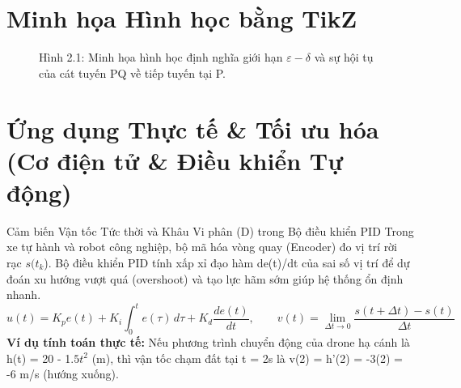 \documentclass[11pt,a4paper,oneside]{book}
\begin{document}
\section{Minh họa Hình học bằng TikZ}
\begin{figure}[htbp]
\centering
{}
\caption{Hình 2.1: Minh họa hình học định nghĩa giới hạn $\varepsilon - \delta$  và sự hội tụ của cát tuyến PQ về tiếp tuyến tại P.}
\label{fig:tikz-ch2-epsilon-delta}
\end{figure}

\section{Ứng dụng Thực tế \& Tối ưu hóa (Cơ điện tử \& Điều khiển Tự động)}
\begin{ungdung}{Cảm biến Vận tốc Tức thời và Khâu Vi phân (D) trong Bộ điều khiển PID}
Trong xe tự hành và robot công nghiệp, bộ mã hóa vòng quay (Encoder) đo vị trí rời rạc $s(t_k$). Bộ điều khiển PID tính xấp xỉ đạo hàm de(t)/dt của sai số vị trí để dự đoán xu hướng vượt quá (overshoot) và tạo lực hãm sớm giúp hệ thống ổn định nhanh.
\[ u(t) = K_p e(t) + K_i \int_0^t e(\tau)\,d\tau + K_d \frac{de(t)}{dt}, \qquad v(t) = \lim_{\Delta t \to 0} \frac{s(t + \Delta t) - s(t)}{\Delta t} \]
\noindent\textbf{Ví dụ tính toán thực tế:} Nếu phương trình chuyển động của drone hạ cánh là h(t) = 20 - 1.$5t^2$ (m), thì vận tốc chạm đất tại t = 2s là v(2) = h'(2) = -3(2) = -6 m/s (hướng xuống).
\end{ungdung}
\end{document}
